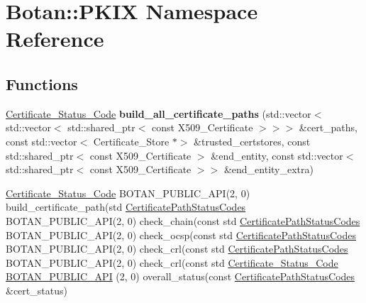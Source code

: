 \hypertarget{namespace_botan_1_1_p_k_i_x}{}\section{Botan\+:\+:P\+K\+IX Namespace Reference}
\label{namespace_botan_1_1_p_k_i_x}
\subsection*{Functions}
\begin{DoxyCompactItemize}
\item 
\mbox{\label{namespace_botan_1_1_p_k_i_x_a0088a8298180d3f9cfb6a8f1c0cd3253}} 
\hyperlink{namespace_botan_ae1e907dc90937bdda30f65216e68ff2b}{Certificate\+\_\+\+Status\+\_\+\+Code} {\bfseries build\+\_\+all\+\_\+certificate\+\_\+paths} (std\+::vector$<$ std\+::vector$<$ std\+::shared\+\_\+ptr$<$ const X509\+\_\+\+Certificate $>$$>$$>$ \&cert\+\_\+paths, const std\+::vector$<$ Certificate\+\_\+\+Store $\ast$$>$ \&trusted\+\_\+certstores, const std\+::shared\+\_\+ptr$<$ const X509\+\_\+\+Certificate $>$ \&end\+\_\+entity, const std\+::vector$<$ std\+::shared\+\_\+ptr$<$ const X509\+\_\+\+Certificate $>$$>$ \&end\+\_\+entity\+\_\+extra)
\item 
\hyperlink{namespace_botan_ae1e907dc90937bdda30f65216e68ff2b}{Certificate\+\_\+\+Status\+\_\+\+Code} B\+O\+T\+A\+N\+\_\+\+P\+U\+B\+L\+I\+C\+\_\+\+A\+PI(2, 0) build\+\_\+certificate\+\_\+path(std \hyperlink{namespace_botan_a013252aabcb201e0d27b60b1e690886b}{Certificate\+Path\+Status\+Codes} B\+O\+T\+A\+N\+\_\+\+P\+U\+B\+L\+I\+C\+\_\+\+A\+PI(2, 0) check\+\_\+chain(const std \hyperlink{namespace_botan_a013252aabcb201e0d27b60b1e690886b}{Certificate\+Path\+Status\+Codes} B\+O\+T\+A\+N\+\_\+\+P\+U\+B\+L\+I\+C\+\_\+\+A\+PI(2, 0) check\+\_\+ocsp(const std \hyperlink{namespace_botan_a013252aabcb201e0d27b60b1e690886b}{Certificate\+Path\+Status\+Codes} B\+O\+T\+A\+N\+\_\+\+P\+U\+B\+L\+I\+C\+\_\+\+A\+PI(2, 0) check\+\_\+crl(const std \hyperlink{namespace_botan_a013252aabcb201e0d27b60b1e690886b}{Certificate\+Path\+Status\+Codes} B\+O\+T\+A\+N\+\_\+\+P\+U\+B\+L\+I\+C\+\_\+\+A\+PI(2, 0) check\+\_\+crl(const std \hyperlink{namespace_botan_ae1e907dc90937bdda30f65216e68ff2b}{Certificate\+\_\+\+Status\+\_\+\+Code} \hyperlink{namespace_botan_1_1_p_k_i_x_aa89b961cb12e496c942682134924ad40}{B\+O\+T\+A\+N\+\_\+\+P\+U\+B\+L\+I\+C\+\_\+\+A\+PI} (2, 0) overall\+\_\+status(const \hyperlink{namespace_botan_a013252aabcb201e0d27b60b1e690886b}{Certificate\+Path\+Status\+Codes} \&cert\+\_\+status)
\end{DoxyCompactItemize}
